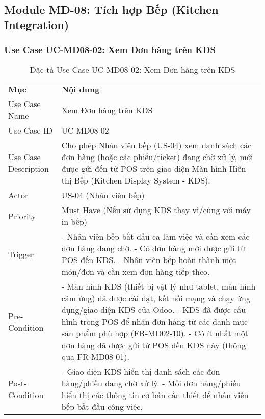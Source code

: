 \subsection{Module MD-08: Tích hợp Bếp (Kitchen Integration)}

\subsubsection{Use Case UC-MD08-02: Xem Đơn hàng trên KDS}

\begin{longtable}{|m{4cm}|p{11cm}|}
\caption{Đặc tả Use Case UC-MD08-02: Xem Đơn hàng trên KDS} \label{tab:uc_md08_02} \\
\hline

\endhead %
\hline
\endfoot %
\hline
\endlastfoot %
\multicolumn{2}{|c|}{\textbf{2.1. Tóm tắt (Summary)}} \\
\hline
\textbf{Mục} & \textbf{Nội dung} \\
\hline
Use Case Name & Xem Đơn hàng trên KDS \\
\hline
Use Case ID & UC-MD08-02 \\
\hline
Use Case Description & Cho phép Nhân viên bếp (US-04) xem danh sách các đơn hàng (hoặc các phiếu/ticket) đang chờ xử lý, mới được gửi đến từ POS trên giao diện Màn hình Hiển thị Bếp (Kitchen Display System - KDS). \\
\hline
Actor & US-04 (Nhân viên bếp) \\
\hline
Priority & Must Have (Nếu sử dụng KDS thay vì/cùng với máy in bếp) \\
\hline
Trigger & - Nhân viên bếp bắt đầu ca làm việc và cần xem các đơn hàng đang chờ. \newline - Có đơn hàng mới được gửi từ POS đến KDS. \newline - Nhân viên bếp hoàn thành một món/đơn và cần xem đơn hàng tiếp theo. \\
\hline
Pre-Condition & - Màn hình KDS (thiết bị vật lý như tablet, màn hình cảm ứng) đã được cài đặt, kết nối mạng và chạy ứng dụng/giao diện KDS của Odoo. \newline - KDS đã được cấu hình trong POS để nhận đơn hàng từ các danh mục sản phẩm phù hợp (FR-MD02-10). \newline - Có ít nhất một đơn hàng đã được gửi từ POS đến KDS này (thông qua FR-MD08-01). \\
\hline
Post-Condition & - Giao diện KDS hiển thị danh sách các đơn hàng/phiếu đang chờ xử lý. \newline - Mỗi đơn hàng/phiếu hiển thị các thông tin cơ bản cần thiết để nhân viên bếp bắt đầu công việc. \\

\end{longtable}
